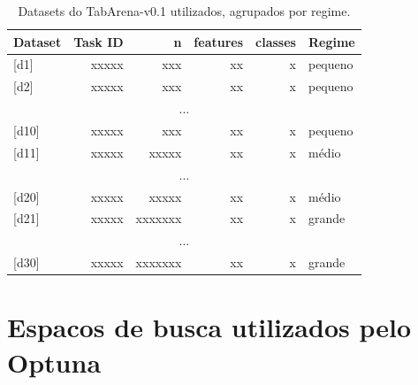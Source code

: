 \documentclass[11pt,a4paper]{article}
\begin{document}
\begin{table}[h]
\centering
\caption{Datasets do TabArena-v0.1 utilizados, agrupados por regime.}
\label{tab:datasets}
\footnotesize
\begin{tabular}{l r r r r l}
\toprule
\textbf{Dataset} & \textbf{Task ID} & \textbf{n} & \textbf{features} & \textbf{classes} & \textbf{Regime} \\
\midrule
{}[d1]  & xxxxx & xxx     & xx & x & pequeno \\
{}[d2]  & xxxxx & xxx     & xx & x & pequeno \\
\multicolumn{6}{c}{...} \\
{}[d10] & xxxxx & xxx     & xx & x & pequeno \\
{}[d11] & xxxxx & xxxxx   & xx & x & médio \\
\multicolumn{6}{c}{...} \\
{}[d20] & xxxxx & xxxxx   & xx & x & médio \\
{}[d21] & xxxxx & xxxxxxx & xx & x & grande \\
\multicolumn{6}{c}{...} \\
{}[d30] & xxxxx & xxxxxxx & xx & x & grande \\
\bottomrule
\end{tabular}
\end{table}

\section{Espacos de busca utilizados pelo Optuna}

\end{document}
